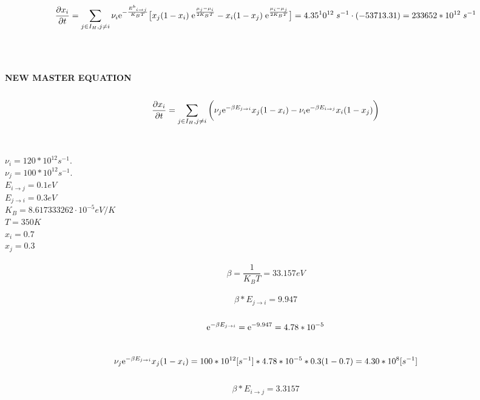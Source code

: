 \documentclass{article}
\begin{document}
\begin{equation}
    \frac{\partial x_i}{\partial t} = \sum_{j \in I_H,j \neq i}\nu_i  {\rm e}^{ -\frac{{E^b}_{i\rightarrow j}}{K_B T}} \big[ x_j(1-x_i)\;{\rm e}^{\frac{\mu_j-\mu_i}{2K_B T}} - x_i(1-x_j)\;{\rm e}^{\frac{\mu_i-\mu_j}{2K_B T}} \big]= 4.35 ^10^{12}\; s^{-1} \cdot (- 53713.31)=233652*10^{12} \; s^{-1}
\end{equation}
\\ \\ \\
\textbf{NEW MASTER EQUATION}
\\ \\
\begin{equation}
    \frac{\partial x_i}{\partial t}= \sum_{j \in I_H,j \neq i} \bigg( \nu_j{\rm e}^{-\beta {E}_{j\rightarrow i}} x_j(1-x_i)  - \nu_i{\rm e}^{-\beta {E}_{i\rightarrow j}} x_i(1-x_j) \bigg)
\end{equation}
\\ \\
$\nu_i = 120 *10^{12}s^{-1}.$
\\
$\nu_j = 100*10^{12} s^{-1}.$
\\
${E}_{i\rightarrow j}=0.1 eV$
\\
${E}_{j\rightarrow i}=0.3 eV$
\\
$K_B = 8.617333262 \cdot 10^{-5} eV/K$
\\
$T = 350K$
\\
$x_i = 0.7$
\\
$x_j = 0.3$
\\ \\
\begin{equation}
    \beta = \frac{1}{K_BT}=33.157 eV
\end{equation}
\\
\begin{equation}
\beta * {E}_{j\rightarrow i}=9.947
\end{equation}
\\
\begin{equation}
    {\rm e}^{-\beta {E}_{j\rightarrow i}} = {\rm e}^{-9.947}=4.78*10^{-5}
\end{equation}
\\
\begin{equation}
    \nu_j{\rm e}^{-\beta {E}_{j\rightarrow i}} x_j(1-x_i) =  100*10^{12}[s^{-1}]*4.78*10^{-5} * 0.3(1-0.7)=4.30*10^{8}[s^{-1}]
\end{equation}
\\
\begin{equation}
\beta * {E}_{i\rightarrow j}=3.3157
\end{equation}
\end{document}
